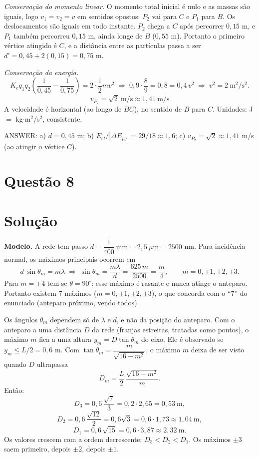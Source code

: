\documentclass{article}%
\begin{document}
\emph{Conservação do momento linear.} O momento total inicial é nulo e as massas são iguais, logo $v_1=v_2=v$ em sentidos opostos: $P_2$ vai para $C$ e $P_1$ para $B$. Os deslocamentos são iguais em todo instante. $P_2$ chega a $C$ após percorrer $0{,}15$ m, e $P_1$ também percorreu $0{,}15$ m, ainda longe de $B$ ($0{,}55$ m). Portanto o primeiro vértice atingido é $C$, e a distância entre as partículas passa a ser $d'=0{,}45+2(0{,}15)=0{,}75$ m.

\emph{Conservação da energia.}
\[
K_eq_1q_2\left(\frac1{0{,}45}-\frac1{0{,}75}\right)=2\cdot\frac12mv^2
\;\Rightarrow\;
0{,}9\cdot\frac89=0{,}8=0{,}4\,v^2
\;\Rightarrow\; v^2=2\ \text{m}^2/\text{s}^2.
\]
\[
\boxed{v_{P_2}=\sqrt2\ \text{m/s}\approx1{,}41\ \text{m/s}}
\]
A velocidade é horizontal (ao longo de $BC$), no sentido de $B$ para $C$. Unidades: J $=$ kg$\cdot$m$^2$/s$^2$, consistente.

\medskip
ANSWER: a) $d=0{,}45$ m; b) $E_{el}/|\Delta E_{pg}|=29/18\approx1{,}6$; c) $v_{P_2}=\sqrt2\approx1{,}41$ m/s (ao atingir o vértice $C$).%
\newpage%
\section*{Questão 8}

\section*{Solução}

\textbf{Modelo.} A rede tem passo $d=\dfrac{1}{400}\ \text{mm}=2{,}5\ \mu\text{m}=2500$ nm. Para incidência normal, os máximos principais ocorrem em
\[
d\,\sin\theta_m=m\lambda \;\Rightarrow\; \sin\theta_m=\frac{m\lambda}{d}=\frac{625\,m}{2500}=\frac{m}{4},\qquad m=0,\pm1,\pm2,\pm3 .
\]
Para $m=\pm4$ tem-se $\theta=90^\circ$: esse máximo é rasante e nunca atinge o anteparo. Portanto existem 7 máximos ($m=0,\pm1,\pm2,\pm3$), o que concorda com o ``7'' do enunciado (anteparo próximo, vendo todos).

Os ângulos $\theta_m$ dependem só de $\lambda$ e $d$, e não da posição do anteparo. Com o anteparo a uma distância $D$ da rede (franjas estreitas, tratadas como pontos), o máximo $m$ fica a uma altura $y_m=D\tan\theta_m$ do eixo. Ele é observado se $y_m\le L/2=0{,}6$ m. Com $\tan\theta_m=\dfrac{m}{\sqrt{16-m^2}}$, o máximo $m$ deixa de ser visto quando $D$ ultrapassa
\[
D_m=\frac{L}{2}\,\frac{\sqrt{16-m^2}}{m}.
\]
Então:
\[
D_3=0{,}6\,\frac{\sqrt7}{3}=0{,}2\cdot2{,}65=0{,}53\ \text{m},
\]
\[
D_2=0{,}6\,\frac{\sqrt{12}}{2}=0{,}6\sqrt3=0{,}6\cdot1{,}73\approx1{,}04\ \text{m},
\]
\[
D_1=0{,}6\,\sqrt{15}=0{,}6\cdot3{,}87\approx2{,}32\ \text{m}.
\]
Os valores crescem com a ordem decrescente: $D_3<D_2<D_1$. Os máximos $\pm3$ saem primeiro, depois $\pm2$, depois $\pm1$.
\end{document}
